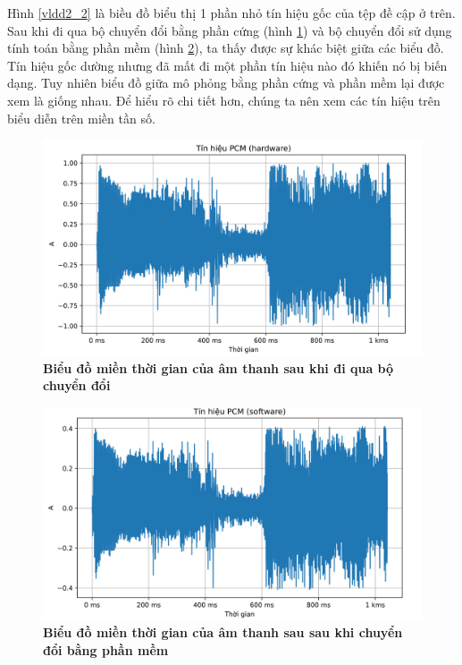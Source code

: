 Hình \ref{vldd2_2} là biều đồ biểu thị 1 phần nhỏ tín hiệu gốc của tệp đề cập ở trên. Sau khi đi qua bộ chuyển đổi bằng phần cứng (hình \ref{vldd2_0}) và bộ chuyển đổi sử dụng tính toán bằng phần mềm (hình \ref{vldd2_1}), ta thấy được sự khác biệt giữa các biểu đồ. Tín hiệu gốc dường nhưng đã mất đi một phần tín hiệu nào đó khiến nó bị biến dạng. Tuy nhiên biểu đồ giữa mô phỏng bằng phần cứng và phần mềm lại được xem là giống nhau. Để hiểu rõ chi tiết hơn, chúng ta nên xem các tín hiệu trên biểu diễn trên miền tần số.

\begin{figure}[H]
    \centering
    \includegraphics[width=14cm]{Images/Chuong4/tb/wav/vldd2_0.png}
    \caption[Biểu đồ miền thời gian của âm thanh sau khi đi qua bộ chuyển đổi]{\bfseries \fontsize{12pt}{0pt}\selectfont  Biểu đồ miền thời gian của âm thanh sau khi đi qua bộ chuyển đổi }
    \label{vldd2_0}
\end{figure}

\begin{figure}[H]
    \centering
    \includegraphics[width=14cm]{Images/Chuong4/tb/wav/vldd2_1.png}
    \caption[Biểu đồ miền thời gian của âm thanh sau sau khi chuyển đổi bằng phần mềm]{\bfseries \fontsize{12pt}{0pt}\selectfont  Biểu đồ miền thời gian của âm thanh sau sau khi chuyển đổi bằng phần mềm}
    \label{vldd2_1}
\end{figure}

